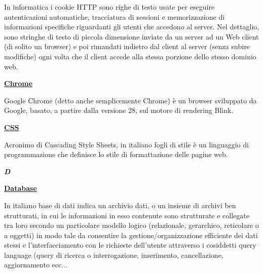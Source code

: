 \medskip
\begin{addmargin}[5em]{1em}	
In informatica i cookie HTTP sono righe di testo usate per eseguire autenticazioni automatiche, tracciatura di sessioni e memorizzazione di informazioni specifiche riguardanti gli utenti che accedono al server. Nel dettaglio, sono stringhe di testo di piccola dimensione inviate da un server ad un Web client (di solito un browser) e poi rimandati indietro dal client al server (senza subire modifiche) ogni volta che il client accede alla stessa porzione dello stesso dominio web.
\end{addmargin}

\bigskip
\begin{addmargin}[0em]{0em}	
	\textbf{\underline{Chrome}}
\end{addmargin}
	
\medskip
\begin{addmargin}[5em]{1em}	
Google Chrome (detto anche semplicemente Chrome) è un browser sviluppato da Google, basato, a partire dalla versione 28, sul motore di rendering Blink.
\end{addmargin}

\bigskip
\begin{addmargin}[0em]{0em}	
	\textbf{\underline{CSS}}
\end{addmargin}

\medskip
	\begin{addmargin}[5em]{1em}	
Acronimo di Cascading Style Sheets, in italiano fogli di stile è un linguaggio di programmazione che definisce lo stile di formattazione delle pagine web.
\end{addmargin}

\newpage

\cleardoublepage
{}
{}
\noindent\hrulefill\hspace{4mm}\textbf{\textsl{\Huge{D}}}\hspace{4mm}\hrulefill

\vspace*{2\bigskipamount}

\begin{addmargin}[0em]{0em}	
	\textbf{\underline{Database}}
\end{addmargin}

\medskip
\begin{addmargin}[5em]{1em}	
In italiano base di dati indica un archivio dati, o un insieme di archivi ben strutturati, in cui le informazioni in esso contenute sono strutturate e collegate tra loro secondo un particolare modello logico (relazionale, gerarchico, reticolare o a oggetti) in modo tale da consentire la gestione/organizzazione efficiente dei dati stessi e l'interfacciamento con le richieste dell'utente attraverso i cosiddetti query language (query di ricerca o interrogazione, inserimento, cancellazione, aggiornamento ecc...
\end{addmargin}	

